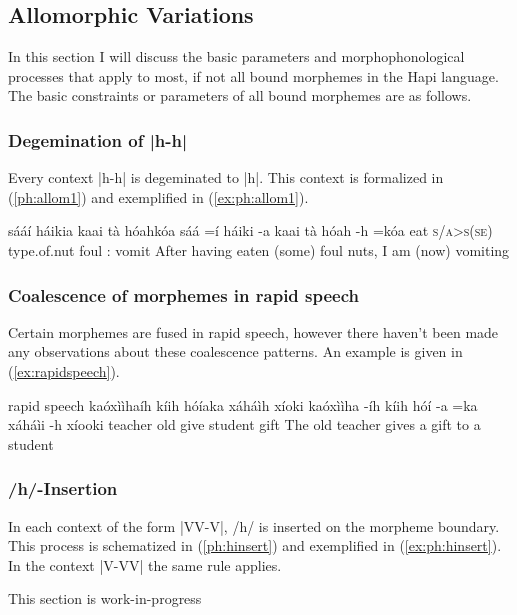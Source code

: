 \documentclass[a4paper, 12pt, oneside]{memoir}
\begin{document}
\subsection{Allomorphic Variations}\label{sallomorphicvariations}
In this section I will discuss the basic parameters and morphophonological processes that apply to most, if not all bound morphemes in the Hapi language. The basic constraints or parameters of all bound morphemes are as follows. 
\subsubsection{Degemination of |h-h|}
Every context |h-h| is degeminated to |h|. This context is formalized in (\ref{ph:allom1}) and exemplified in (\ref{ex:ph:allom1}).
\begin{examples}
\ex \label{ph:allom1} 
\end{examples}
\begin{examples}
\ex\label{ex:ph:allom1}
\words sááí háikia kaai tà hóahkóa
\bits sáá =í háiki -a kaai tà hóah -h =kóa
\gloss eat \textsc{s/a>s(se)} type.of.nut {\Pl} foul {\Fs}:{\Subject} vomit {\Ff} {\Decl}
\tr After having eaten (some) foul nuts, I am (now) vomiting
\end{examples}
\subsubsection{Coalescence of morphemes in rapid speech}
Certain morphemes are fused in rapid speech, however there haven't been made any observations about these coalescence patterns. An example is given in (\ref{ex:rapidspeech}).
\begin{examples}
\ex \label{ex:rapidspeech}
\manner rapid speech
\words kaóxììhaíh kíih hóíaka xáháìh xíoki
\bits kaóxììha -íh kíih hóí -a =ka xáháìi -h xíooki
\gloss teacher {\Erg} old give {\St} {\Decl} student {\Dat} gift
\tr The old teacher gives a gift to a student
\end{examples}
\subsubsection{/h/-Insertion}
In each context of the form |VV-V|, /h/ is inserted on the morpheme boundary. This process is schematized in (\ref{ph:hinsert}) and exemplified in (\ref{ex:ph:hinsert}). In the context |V-VV| the same rule applies.
\begin{examples}
\ex \label{ph:hinsert} 
\ex \label{ex:ph:hinsert}
This section is work-in-progress
\end{examples}
\end{document}
